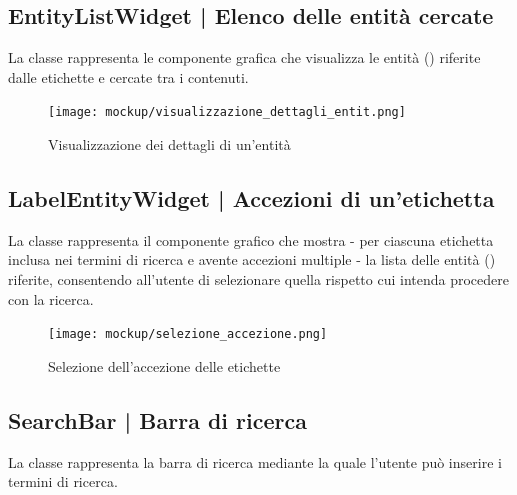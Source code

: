\documentclass[10pt,a4paper,headinclude,footinclude,hidelinks]{scrreprt} %
\begin{document}
	\subsection[EntityListWidget]{EntityListWidget | Elenco delle entità cercate}
	\label{sec:stage:design:view.search:search-entity-list}
	La classe \textit{} rappresenta le componente grafica che visualizza le entità (\textit{}) riferite dalle etichette e cercate tra i contenuti.

	\begin{figure}[ht]
		\begin{center}
	    	\texttt{[image: mockup/visualizzazione\_dettagli\_entit.png]}
			\label{gfx:mockup:entity-list}
			\caption{Visualizzazione dei dettagli di un'entità}
		\end{center}
	\end{figure}

	\subsection[LabelEntityWidget]{LabelEntityWidget | Accezioni di un'etichetta}
	\label{sec:stage:design:view.search:label-entity-list}
	La classe \textit{} rappresenta il componente grafico che mostra - per ciascuna etichetta inclusa nei termini di ricerca e avente accezioni multiple - la lista delle entità (\textit{}) riferite, consentendo all'utente di selezionare quella rispetto cui intenda procedere con la ricerca.

	\begin{figure}[ht]
		\begin{center}
	    	\texttt{[image: mockup/selezione\_accezione.png]}
			\label{gfx:mockup:label-entity}
			\caption{Selezione dell'accezione delle etichette}
		\end{center}
	\end{figure}

	\subsection[SearchBar]{SearchBar | Barra di ricerca}
	\label{sec:stage:design:view.search:search-bar}
	La classe \textit{} rappresenta la barra di ricerca mediante la quale l'utente può inserire i termini di ricerca.
\end{document}
